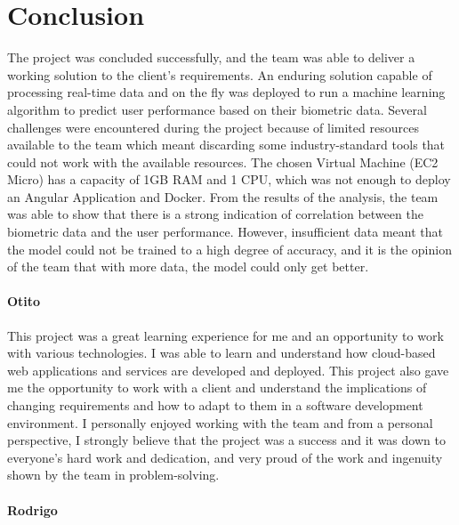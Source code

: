 \chapter{Conclusion}

The project was concluded successfully, and the team was able to deliver a working solution to the client's requirements. An enduring
solution capable of processing real-time data and on the fly was deployed to run a machine learning algorithm to predict user performance
based on their biometric data. Several challenges were encountered during the project because of limited resources available to the team
which meant discarding some industry-standard tools that could not work with the available resources. The chosen Virtual Machine (EC2 Micro)
has a capacity of 1GB RAM and 1 CPU, which was not enough to deploy an Angular Application and Docker. From the results of the analysis, the team
was able to show that there is a strong indication of correlation between the biometric data and the user performance. However, insufficient data
meant that the model could not be trained to a high degree of accuracy, and it is the opinion of the team that with more data, the model could only 
get better.


\subsubsection*{Otito}
This project was a great learning experience for me and an opportunity to work with various technologies. I was able to learn and understand how 
cloud-based web applications and services are developed and deployed. This project also gave me the opportunity to work with a client and understand 
the implications of changing requirements and how to adapt to them in a software development environment. I personally enjoyed working with the team and 
from a personal perspective, I strongly believe that the project was a success and it was down to everyone's hard work and dedication, and very proud of 
the work and ingenuity shown by the team in problem-solving. 

\subsubsection*{Rodrigo}

